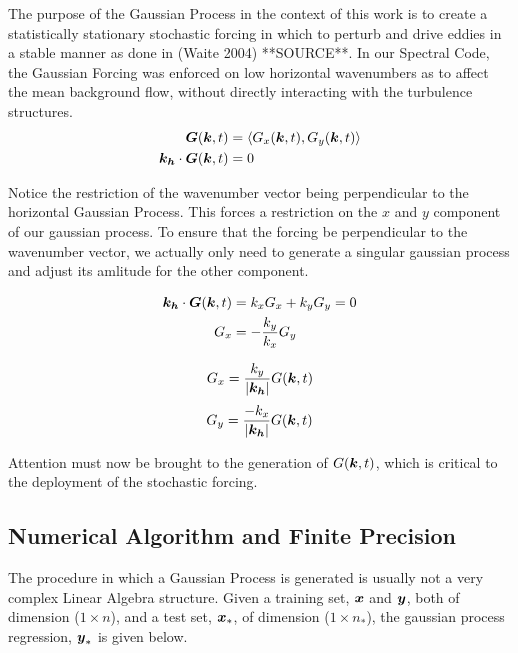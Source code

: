 \documentclass{article}
\begin{document}
The purpose of the Gaussian Process in the context of this work is to create a statistically stationary stochastic forcing in which to perturb and drive eddies in a stable manner as done in (Waite 2004) **SOURCE**. In our Spectral Code, the Gaussian Forcing was enforced on low horizontal wavenumbers as to affect the mean background flow, without directly interacting with the turbulence structures.
\begin{align*}
    \boldsymbol{G}(\boldsymbol{k}, t) &= \left<G_x(\boldsymbol{k}, t), G_y(\boldsymbol{k}, t)\right> \\
    \boldsymbol{k_h} \cdot  \boldsymbol{G}(\boldsymbol{k}, t) &= 0
\end{align*}

Notice the restriction of the wavenumber vector being perpendicular to the horizontal Gaussian Process. This forces a restriction on the $x$ and $y$ component of our gaussian process. To ensure that the forcing be perpendicular to the wavenumber vector, we actually only need to generate a singular gaussian process and adjust its amlitude for the other component.

\begin{align*}
    \boldsymbol{k_h} \cdot  \boldsymbol{G}(\boldsymbol{k}, t) &= k_xG_x + k_yG_y = 0 \\
    G_x &= -\frac{k_y}{k_x}G_y
\end{align*}

    \begin{align*}
        G_x = \frac{k_y}{|\boldsymbol{k_h}|}G(\boldsymbol{k}, t)
    \end{align*}
\emp
{}
    \begin{align*}
        G_y = \frac{-k_x}{|\boldsymbol{k_h}|}G(\boldsymbol{k}, t)
    \end{align*}
\emp

Attention must now be brought to the generation of $G(\boldsymbol{k}, t)$, which is critical to the deployment of the stochastic forcing. 

\subsection{Numerical Algorithm and Finite Precision}
The procedure in which a Gaussian Process is generated is usually not a very complex Linear Algebra structure. Given a training set, $\boldsymbol{x}$ and $\boldsymbol{y}$, both of dimension ($1 \times n$), and a test set, $\boldsymbol{x}_*$, of dimension ($1 \times n_*$), the gaussian process regression, $\boldsymbol{y}_*$ is given below.
\end{document}
